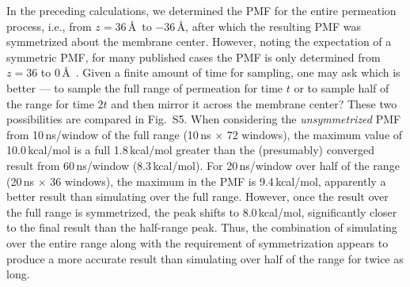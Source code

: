   \par In the preceding calculations, we determined the PMF for the entire permeation process, i.e., from $z=36$\,\AA~to $-36$\,\AA, after which the resulting PMF was symmetrized about the membrane center.  However, noting the expectation of a symmetric PMF, for many published cases the PMF is only determined from $z=36$ to 0\,\AA~\cite{Marrink1996,Bemporad2004,Holland2012}.  Given a finite amount of time for sampling, one may ask which is better --- to sample the full range of permeation for time $t$ or to sample half of the range for time $2t$ and then mirror it across the membrane center?  These two possibilities are compared in Fig.~S5.  When considering the {\it unsymmetrized} PMF from 10\,ns/window of the full range (10\,ns $\times$ 72 windows), the maximum value of 10.0\,kcal/mol is a full 1.8\,kcal/mol greater than the (presumably) converged result from 60\,ns/window (8.3\,kcal/mol).  For 20\,ns/window over half of the range (20\,ns $\times$ 36 windows), the maximum in the PMF is 9.4\,kcal/mol, apparently a better result than simulating over the full range.  However, once the result over the full range is symmetrized, the peak shifts to 8.0\,kcal/mol, significantly closer to the final result than the half-range peak.  Thus, the combination of simulating over the entire range along with the requirement of symmetrization appears to produce a more accurate result than simulating over half of the range for twice as long.
